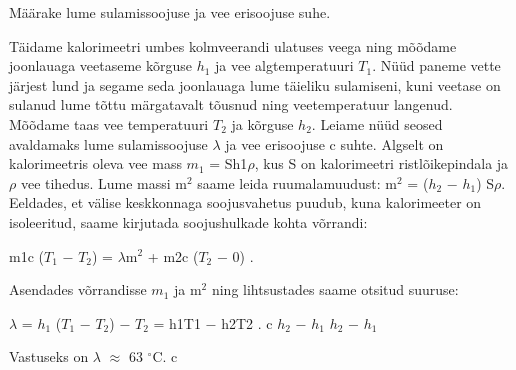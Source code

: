 
Määrake lume sulamissoojuse ja vee erisoojuse suhe.

\hint

\solu
Täidame kalorimeetri umbes kolmveerandi ulatuses veega ning mõõdame joonlauaga veetaseme kõrguse $h_1$ ja vee algtemperatuuri $T_1$. Nüüd paneme vette järjest lund ja segame seda joonlauaga lume täieliku sulamiseni, kuni veetase on sulanud lume tõttu märgatavalt tõusnud ning veetemperatuur langenud. Mõõdame taas vee temperatuuri $T_2$ ja kõrguse $h_2$. Leiame nüüd seosed avaldamaks lume sulamissoojuse $\lambda$ ja vee erisoojuse c suhte. Algselt on kalorimeetris oleva vee mass $m_1$ = Sh1$\rho$, kus S on kalorimeetri ristlõikepindala ja $\rho$ vee tihedus. Lume massi m$^2$ saame leida ruumalamuudust: m$^2$ = ($h_2$ $-$ $h_1$) S$\rho$. Eeldades, et välise keskkonnaga soojusvahetus puudub, kuna kalorimeeter on isoleeritud, saame kirjutada soojushulkade kohta võrrandi:

m1c ($T_1$ $-$ $T_2$) = $\lambda$m$^2$ + m2c ($T_2$ $-$ 0) .

Asendades võrrandisse $m_1$ ja m$^2$ ning lihtsustades saame otsitud suuruse:

$\lambda$ = $h_1$ ($T_1$ $-$ $T_2$) $-$ $T_2$ = h1T1 $-$ h2T2 . c $h_2$ $-$ $h_1$ $h_2$ $-$ $h_1$

Vastuseks on $\lambda$ $\approx$ 63 $^\circ$C. c
\probend
